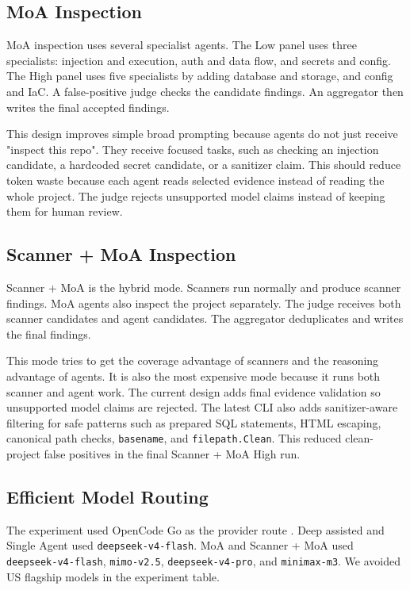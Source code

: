 \documentclass[sigconf,nonacm]{acmart}
\begin{document}
\subsection{MoA Inspection}
MoA inspection uses several specialist agents. The Low panel uses three specialists: injection and execution, auth and data flow, and secrets and config. The High panel uses five specialists by adding database and storage, and config and IaC. A false-positive judge checks the candidate findings. An aggregator then writes the final accepted findings.

This design improves simple broad prompting because agents do not just receive "inspect this repo". They receive focused tasks, such as checking an injection candidate, a hardcoded secret candidate, or a sanitizer claim. This should reduce token waste because each agent reads selected evidence instead of reading the whole project. The judge rejects unsupported model claims instead of keeping them for human review.

\subsection{Scanner + MoA Inspection}
Scanner + MoA is the hybrid mode. Scanners run normally and produce scanner findings. MoA agents also inspect the project separately. The judge receives both scanner candidates and agent candidates. The aggregator deduplicates and writes the final findings.

This mode tries to get the coverage advantage of scanners and the reasoning advantage of agents. It is also the most expensive mode because it runs both scanner and agent work. The current design adds final evidence validation so unsupported model claims are rejected. The latest CLI also adds sanitizer-aware filtering for safe patterns such as prepared SQL statements, HTML escaping, canonical path checks, \texttt{basename}, and \texttt{filepath.Clean}. This reduced clean-project false positives in the final Scanner + MoA High run.

\subsection{Efficient Model Routing}
The experiment used OpenCode Go as the provider route \cite{opencodego}. Deep assisted and Single Agent used \texttt{deepseek-v4-flash}. MoA and Scanner + MoA used \texttt{deepseek-v4-flash}, \texttt{mimo-v2.5}, \texttt{deepseek-v4-pro}, and \texttt{minimax-m3}. We avoided US flagship models in the experiment table.
\end{document}
